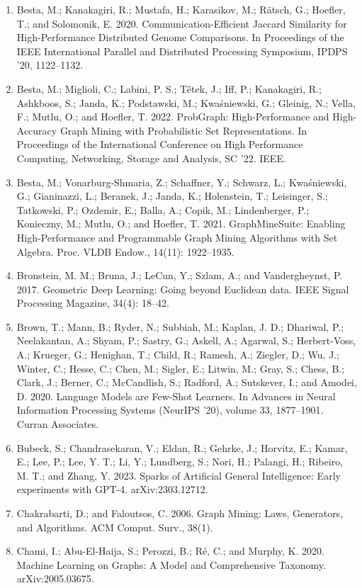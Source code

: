 \documentclass[11pt,UTF8,fontset=fandol]{ctexart}
\begin{document}
\begin{enumerate}[leftmargin=2em]
\item Besta, M.; Kanakagiri, R.; Mustafa, H.; Karasikov, M.; Rätsch, G.; Hoefler, T.; and Solomonik, E. 2020. Communication-Efficient Jaccard Similarity for High-Performance Distributed Genome Comparisons. In Proceedings of the IEEE International Parallel and Distributed Processing Symposium, IPDPS '20, 1122--1132.
\item Besta, M.; Miglioli, C.; Labini, P. S.; Tětek, J.; Iff, P.; Kanakagiri, R.; Ashkboos, S.; Janda, K.; Podstawski, M.; Kwaśniewski, G.; Gleinig, N.; Vella, F.; Mutlu, O.; and Hoefler, T. 2022. ProbGraph: High-Performance and High-Accuracy Graph Mining with Probabilistic Set Representations. In Proceedings of the International Conference on High Performance Computing, Networking, Storage and Analysis, SC '22. IEEE.
\item Besta, M.; Vonarburg-Shmaria, Z.; Schaffner, Y.; Schwarz, L.; Kwaśniewski, G.; Gianinazzi, L.; Beranek, J.; Janda, K.; Holenstein, T.; Leisinger, S.; Tatkowski, P.; Ozdemir, E.; Balla, A.; Copik, M.; Lindenberger, P.; Konieczny, M.; Mutlu, O.; and Hoefler, T. 2021. GraphMineSuite: Enabling High-Performance and Programmable Graph Mining Algorithms with Set Algebra. Proc. VLDB Endow., 14(11): 1922--1935.
\item Bronstein, M. M.; Bruna, J.; LeCun, Y.; Szlam, A.; and Vandergheynst, P. 2017. Geometric Deep Learning: Going beyond Euclidean data. IEEE Signal Processing Magazine, 34(4): 18--42.
\item Brown, T.; Mann, B.; Ryder, N.; Subbiah, M.; Kaplan, J. D.; Dhariwal, P.; Neelakantan, A.; Shyam, P.; Sastry, G.; Askell, A.; Agarwal, S.; Herbert-Voss, A.; Krueger, G.; Henighan, T.; Child, R.; Ramesh, A.; Ziegler, D.; Wu, J.; Winter, C.; Hesse, C.; Chen, M.; Sigler, E.; Litwin, M.; Gray, S.; Chess, B.; Clark, J.; Berner, C.; McCandlish, S.; Radford, A.; Sutskever, I.; and Amodei, D. 2020. Language Models are Few-Shot Learners. In Advances in Neural Information Processing Systems (NeurIPS '20), volume 33, 1877--1901. Curran Associates.
\item Bubeck, S.; Chandrasekaran, V.; Eldan, R.; Gehrke, J.; Horvitz, E.; Kamar, E.; Lee, P.; Lee, Y. T.; Li, Y.; Lundberg, S.; Nori, H.; Palangi, H.; Ribeiro, M. T.; and Zhang, Y. 2023. Sparks of Artificial General Intelligence: Early experiments with GPT-4. arXiv:2303.12712.
\item Chakrabarti, D.; and Faloutsos, C. 2006. Graph Mining: Laws, Generators, and Algorithms. ACM Comput. Surv., 38(1).
\item Chami, I.; Abu-El-Haija, S.; Perozzi, B.; Ré, C.; and Murphy, K. 2020. Machine Learning on Graphs: A Model and Comprehensive Taxonomy. arXiv:2005.03675.

\end{enumerate}
\end{document}
